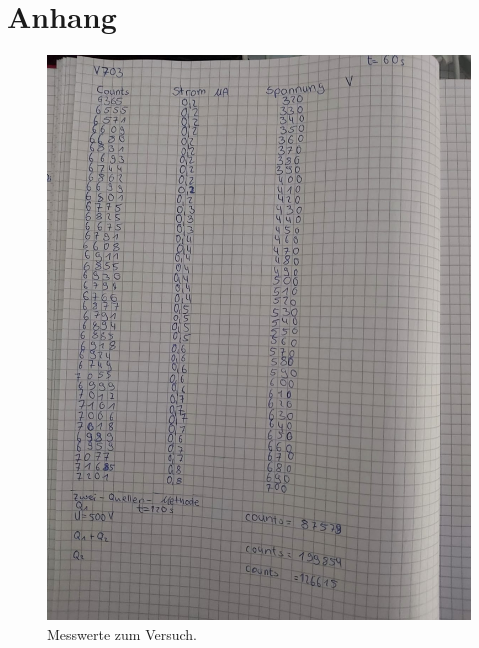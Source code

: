 \section{Anhang}\label{sec:Anhang}
\begin{figure}[H]
   \centering
    \includegraphics[scale=0.4]{Abbildungen/KladdeS1.jpeg}
   \caption{Messwerte zum Versuch.}
\end{figure}
\pagebreak